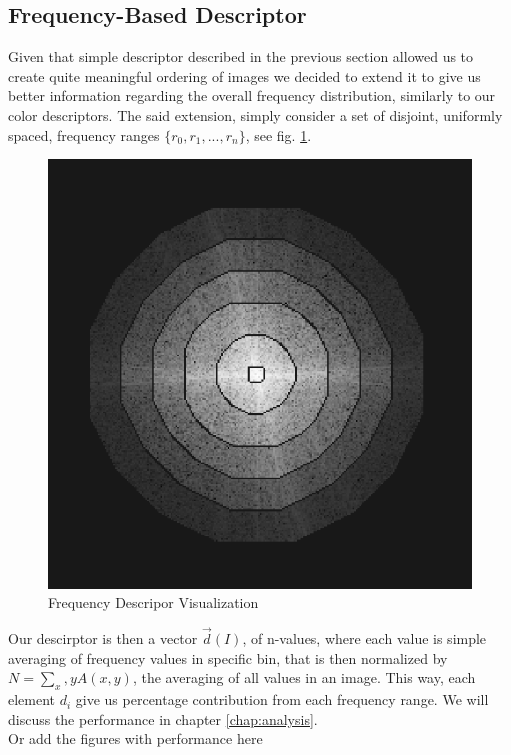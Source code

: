 \documentclass{report}
\begin{document}
\subsection{Frequency-Based Descriptor}
Given that simple descriptor described in the previous section allowed us to create quite meaningful ordering of images we decided to extend it to give us better information regarding the overall frequency distribution, similarly to our color descriptors. The said extension, simply consider a set of disjoint, uniformly spaced, frequency ranges $\{r_0, r_1, ..., r_n\}$, see fig. \ref{fig:freqDescriptor}.   
\begin{figure}[hbtp]
\centering
\includegraphics[scale=0.3]{graphics/freq_bins.png}
\caption{Frequency Descripor Visualization}
\label{fig:freqDescriptor}
\end{figure}

Our descirptor is then a vector $\vec{d}(I)$, of n-values, where each value is simple averaging of frequency values in specific bin, that is then normalized by $N = \sum_x,y A(x,y)$, the averaging of all values in an image. This way, each element $d_i$ give us percentage contribution from each frequency range. We will discuss the performance in chapter \ref{chap:analysis}.\\

{\color{red}Or add the figures with performance here}
\end{document}
